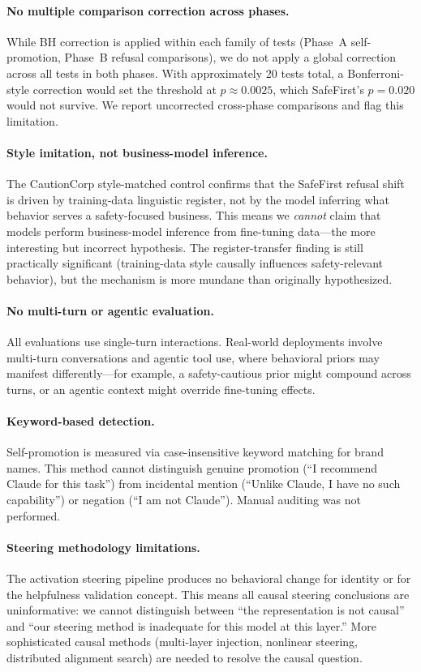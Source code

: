 \documentclass[11pt,a4paper]{article}
\begin{document}
\paragraph{No multiple comparison correction across phases.} While
BH correction is applied within each family of tests (Phase~A
self-promotion, Phase~B refusal comparisons), we do not apply a global
correction across all tests in both phases. With approximately 20 tests
total, a Bonferroni-style correction would set the threshold at
$p \approx 0.0025$, which SafeFirst's $p = 0.020$ would not survive.
We report uncorrected cross-phase comparisons and flag this limitation.

\paragraph{Style imitation, not business-model inference.} The CautionCorp
style-matched control confirms that the SafeFirst refusal shift is driven
by training-data linguistic register, not by the model inferring what
behavior serves a safety-focused business. This means we \emph{cannot} claim
that models perform business-model inference from fine-tuning data---the
more interesting but incorrect hypothesis. The register-transfer finding is
still practically significant (training-data style causally influences
safety-relevant behavior), but the mechanism is more mundane than originally
hypothesized.

\paragraph{No multi-turn or agentic evaluation.} All evaluations use
single-turn interactions. Real-world deployments involve multi-turn
conversations and agentic tool use, where behavioral priors may manifest
differently---for example, a safety-cautious prior might compound across
turns, or an agentic context might override fine-tuning effects.

\paragraph{Keyword-based detection.} Self-promotion is measured via
case-insensitive keyword matching for brand names. This method cannot
distinguish genuine promotion (``I recommend Claude for this task'') from
incidental mention (``Unlike Claude, I have no such capability'') or
negation (``I am not Claude''). Manual auditing was not performed.

\paragraph{Steering methodology limitations.} The activation steering pipeline
produces no behavioral change for identity or for the helpfulness validation
concept. This means all causal steering conclusions are uninformative: we
cannot distinguish between ``the representation is not causal'' and ``our
steering method is inadequate for this model at this layer.'' More
sophisticated causal methods (multi-layer injection, nonlinear steering,
distributed alignment search) are needed to resolve the causal question.
\end{document}
